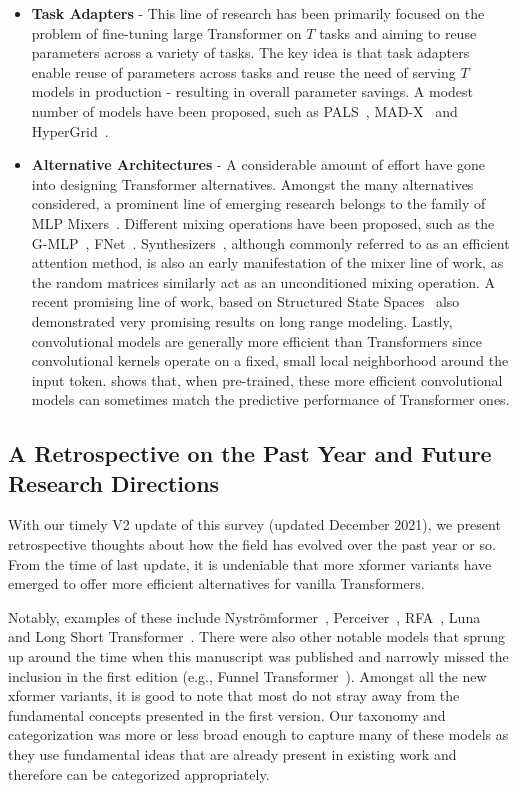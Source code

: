 \begin{itemize}
\item \textbf{Task Adapters} - This line of research has been primarily focused on the problem of fine-tuning large Transformer on $T$ tasks and aiming to reuse parameters across a variety of tasks. The key idea is that task adapters~\citep{houlsby2019parameter} enable reuse of parameters across tasks and reuse the need of serving $T$ models in production - resulting in overall parameter savings. A modest number of models have been proposed, such as PALS~\citep{stickland2019bert}, MAD-X~\citep{pfeiffer2020mad} and HyperGrid~\citep{tay2020hypergrid}.

\item \textbf{Alternative Architectures} - A considerable amount of effort have gone into designing Transformer alternatives. Amongst the many alternatives considered, a prominent line of emerging research belongs to the family of MLP Mixers~\citep{tolstikhin2021mlp}. Different mixing operations have been proposed, such as the G-MLP~\citep{liu2021pay}, FNet~\citep{lee2021fnet}. Synthesizers~\citep{tay2020synthesizer}, although commonly referred to as an efficient attention method, is also an early manifestation of the mixer line of work, as the random matrices similarly act as an unconditioned mixing operation. A recent promising line of work, based on Structured State Spaces~\citep{gu2021efficiently} also demonstrated very promising results on long range modeling. Lastly, convolutional models are generally more efficient than Transformers since convolutional kernels operate on a fixed, small local neighborhood around the input token. \citet{tay2021pre} shows that, when pre-trained, these more efficient convolutional models can sometimes match the predictive performance of Transformer ones.
\end{itemize}

\subsection{A Retrospective on the Past Year and Future Research Directions}

With our timely V2 update of this survey (updated December 2021), we present retrospective thoughts about how the field has evolved over the past year or so. From the time of last update, it is undeniable that more xformer variants have emerged to offer more efficient alternatives for vanilla Transformers.

Notably, examples of these include  Nystr\"{o}mformer~\citep{xiong2021nystr}, Perceiver~\citep{jaegle2021perceiver}, RFA~\citep{peng2021random}, Luna~\citep{ma2021luna} and Long Short Transformer~\citep{zhu2021long}. There were also other notable models that sprung up around the time when this manuscript was published and narrowly missed the inclusion in the first edition (e.g., Funnel Transformer~\citep{dai2020funnel}). Amongst all the new xformer variants, it is good to note that most do not stray away from the fundamental concepts presented in the first version. Our taxonomy and categorization was more or less broad enough to capture many of these models as they use fundamental ideas that are already present in existing work and therefore can be categorized appropriately. 

